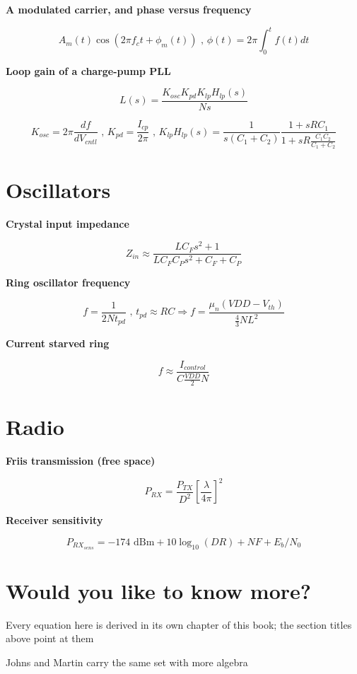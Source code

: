 \textbf{A modulated carrier, and phase versus frequency}

\[ A_m(t)\cos\left(2\pi f_{c}t + \phi_{m}(t)\right) \text{ , } \phi(t) = 2\pi\int_0^t f(t)dt \]

\textbf{Loop gain of a charge-pump PLL}

\[ L(s) = \frac{K_{osc} K_{pd} K_{lp} H_{lp}(s)}{N s} \]

\[ K_{osc} = 2\pi\frac{df}{dV_{cntl}} \text{ , } K_{pd} = \frac{I_{cp}}{2\pi} \text{ , } K_{lp}H_{lp}(s) = \frac{1}{s(C_1 + C_2)}\frac{1 + sRC_1}{1 + sR\frac{C_1C_2}{C_1+C_2}} \]

\section{Oscillators}\label{oscillators}

\textbf{Crystal input impedance}

\[ Z_{in} \approx \frac{L C_F s^2 + 1}{L C_F C_P s^2 + C_F + C_P} \]

\textbf{Ring oscillator frequency}

\[ f = \frac{1}{2 N t_{pd}} \text{ , } t_{pd} \approx RC \Rightarrow f = \frac{\mu_n (VDD-V_{th})}{\frac{4}{3} N L^2} \]

\textbf{Current starved ring}

\[ f \approx \frac{I_{control}}{C \frac{VDD}{2} N} \]

\section{Radio}\label{radio}

\textbf{Friis transmission (free space)}

\[ P_{RX} = \frac{P_{TX}}{D^2}\left[\frac{\lambda}{4\pi}\right]^2 \]

\textbf{Receiver sensitivity}

\[ P_{RX_{sens}} = -174\text{ dBm} + 10\log_{10}(DR) + NF + E_b/N_0 \]

\section{Would you like to know
more?}\label{would-you-like-to-know-more}

Every equation here is derived in its own chapter of this book; the
section titles above point at them

Johns and Martin carry the same set with more algebra

\label{refs}
\begin{CSLReferences}{0}{0}
\CSLLeftMargin{{[}1{]} }%

\end{CSLReferences}
